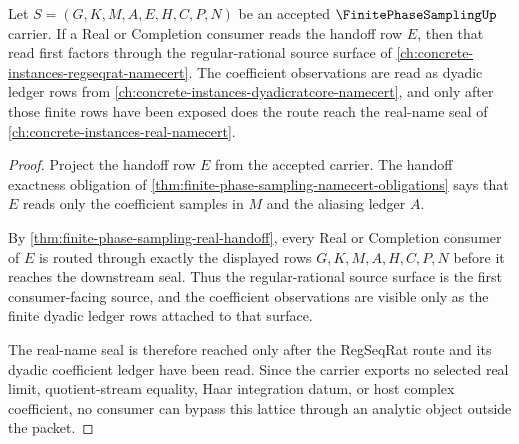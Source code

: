\begin{theorem}
\label{thm:finite-phase-sampling-regseqrat-real-lattice}
Let $S=(G,K,M,A,E,H,C,P,N)$ be an accepted $\FinitePhaseSamplingUp$ carrier. If a Real or Completion consumer reads the handoff row $E$, then that read first factors through the regular-rational source surface of \autoref{ch:concrete-instances-regseqrat-namecert}. The coefficient observations are read as dyadic ledger rows from \autoref{ch:concrete-instances-dyadicratcore-namecert}, and only after those finite rows have been exposed does the route reach the real-name seal of \autoref{ch:concrete-instances-real-namecert}.
\end{theorem}
\begin{proof}
Project the handoff row $E$ from the accepted carrier. The handoff exactness obligation of \autoref{thm:finite-phase-sampling-namecert-obligations} says that $E$ reads only the coefficient samples in $M$ and the aliasing ledger $A$.

By \autoref{thm:finite-phase-sampling-real-handoff}, every Real or Completion consumer of $E$ is routed through exactly the displayed rows $G,K,M,A,H,C,P,N$ before it reaches the downstream seal. Thus the regular-rational source surface is the first consumer-facing source, and the coefficient observations are visible only as the finite dyadic ledger rows attached to that surface.

The real-name seal is therefore reached only after the RegSeqRat route and its dyadic coefficient ledger have been read. Since the carrier exports no selected real limit, quotient-stream equality, Haar integration datum, or host complex coefficient, no consumer can bypass this lattice through an analytic object outside the packet.
\end{proof}

